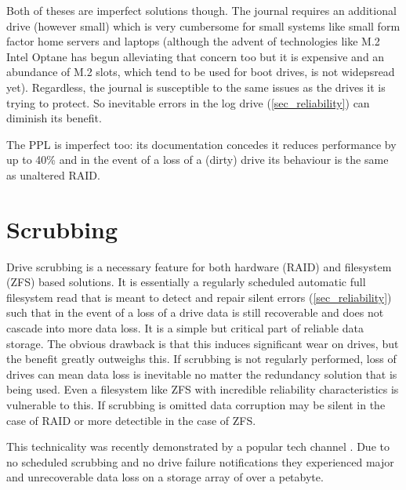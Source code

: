         Both of theses are imperfect solutions though. The journal requires an
        additional drive (however small) which is very cumbersome for small
        systems like small form factor home servers and laptops (although the
        advent of technologies like M.2 Intel Optane \cite{Intel_Optane} has
        begun alleviating that concern too but it is expensive and an abundance
        of M.2 slots, which tend to be used for boot drives, is not widepsread
        yet). Regardless, the journal is susceptible to the same issues as the
        drives it is trying to protect.  So inevitable errors in the log drive
        (\ref{sec_reliability}) can diminish its benefit.

        The PPL is imperfect too: its documentation \cite{partial_parity_log}
        concedes it reduces performance by up to 40\% and in the event of a
        loss of a (dirty) drive its behaviour is the same as unaltered RAID.

    \section{Scrubbing}

        Drive scrubbing is a necessary feature for both hardware (RAID) and
        filesystem (ZFS) based solutions. It is essentially a regularly
        scheduled automatic full filesystem read that is meant to detect and
        repair silent errors (\ref{sec_reliability}) such that in the event of
        a loss of a drive data is still recoverable and does not cascade into
        more data loss. It is a simple but critical part of reliable data
        storage. The obvious drawback is that this induces significant wear on
        drives, but the benefit greatly outweighs this. If scrubbing is not
        regularly performed, loss of drives can mean data loss is inevitable no
        matter the redundancy solution that is being used. Even a filesystem
        like ZFS with incredible reliability characteristics
        \cite{ZFS_reliability} is vulnerable to this. If scrubbing is omitted
        data corruption may be silent in the case of RAID or more detectible in
        the case of ZFS.

        This technicality was recently demonstrated by a popular tech channel
        \cite{LTT_data_loss}. Due to no scheduled scrubbing and no drive
        failure notifications they experienced major and unrecoverable data
        loss on a storage array of over a petabyte.

